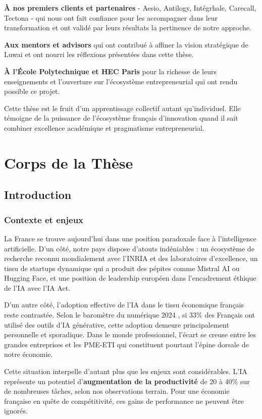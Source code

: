 \documentclass[12pt,a4paper]{report}
\begin{document}
\textbf{À nos premiers clients et partenaires} - Aesio, Antilogy, Intégrhale, Carecall, Tectona - qui nous ont fait confiance pour les accompagner dans leur transformation et ont validé par leurs résultats la pertinence de notre approche.

\textbf{Aux mentors et advisors} qui ont contribué à affiner la vision stratégique de Luwai et ont nourri les réflexions présentées dans cette thèse.

\textbf{À l'École Polytechnique et HEC Paris} pour la richesse de leurs enseignements et l'ouverture sur l'écosystème entrepreneurial qui ont rendu possible ce projet.

Cette thèse est le fruit d'un apprentissage collectif autant qu'individuel. Elle témoigne de la puissance de l'écosystème français d'innovation quand il sait combiner excellence académique et pragmatisme entrepreneurial.

\part{Corps de la Thèse}

\chapter{Introduction}

\section{Contexte et enjeux}

La France se trouve aujourd'hui dans une position paradoxale face à l'intelligence artificielle. D'un côté, notre pays dispose d'atouts indéniables : un écosystème de recherche reconnu mondialement avec l'INRIA et des laboratoires d'excellence, un tissu de startups dynamique qui a produit des pépites comme Mistral AI ou Hugging Face, et une position de leadership européen dans l'encadrement éthique de l'IA avec l'IA Act.

D'un autre côté, l'adoption effective de l'IA dans le tissu économique français reste contrastée. Selon le baromètre du numérique 2024 \cite{laboratoire2025how}, si 33\% des Français ont utilisé des outils d'IA générative, cette adoption demeure principalement personnelle et sporadique. Dans le monde professionnel, l'écart se creuse entre les grandes entreprises et les PME-ETI qui constituent pourtant l'épine dorsale de notre économie.

Cette situation interpelle d'autant plus que les enjeux sont considérables. L'IA représente un potentiel d'\textbf{augmentation de la productivité} de 20 à 40\% sur de nombreuses tâches, selon nos observations terrain. Pour une économie française en quête de compétitivité, ces gains de performance ne peuvent être ignorés.
\end{document}
